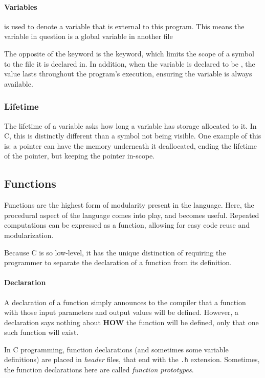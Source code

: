 \paragraph{\texorpdfstring{}{\texttt{extern}} Variables}\label{par:extern_Variables}
 is used to denote a variable that is external to this program.
This means the variable in question is a global variable in another file

The opposite of the  keyword is the  keyword, which limits the scope of a symbol to the file it is declared in.
In addition, when the variable is declared to be , the value lasts throughout the program's execution, ensuring the variable is always available.

\subsubsection{Lifetime}\label{subsubsec:Variable_Lifetime}
The lifetime of a variable asks how long a variable has storage allocated to it.
In C, this is distinctly different than a symbol not being visible.
One example of this is: a pointer can have the memory underneath it deallocated, ending the lifetime of the pointer, but keeping the pointer in-scope.

\subsection{Functions}\label{subsec:Functions}
Functions are the highest form of modularity present in the language.
Here, the procedural aspect of the language comes into play, and becomes useful.
Repeated computations can be expressed as a function, allowing for easy code reuse and modularization.

Because C is so low-level, it has the unique distinction of requiring the programmer to separate the declaration of a function from its definition.

\paragraph{Declaration}\label{par:Function_Declaration}
A declaration of a function simply announces to the compiler that a function with those input parameters and output values will be defined.
However, a declaration says nothing about \textbf{HOW} the function will be defined, only that one such function will exist.

In C programming, function declarations (and sometimes some variable definitions) are placed in \emph{header} files, that end with the \texttt{.h} extension.
Sometimes, the function declarations here are called \emph{function prototypes}.

